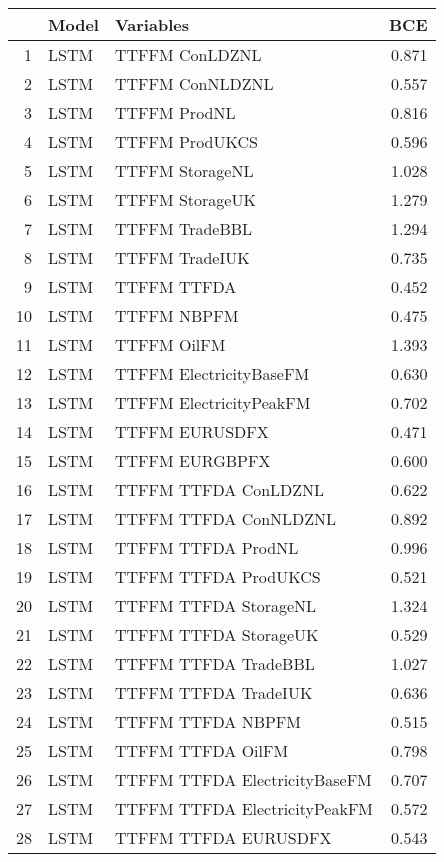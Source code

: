 \begin{table}[ht]
\centering
\begin{tabular}{rllr}
  \hline
 & Model & Variables & BCE \\ 
  \hline
1 & LSTM & TTFFM ConLDZNL & 0.871 \\ 
  2 & LSTM & TTFFM ConNLDZNL & 0.557 \\ 
  3 & LSTM & TTFFM ProdNL & 0.816 \\ 
  4 & LSTM & TTFFM ProdUKCS & 0.596 \\ 
  5 & LSTM & TTFFM StorageNL & 1.028 \\ 
  6 & LSTM & TTFFM StorageUK & 1.279 \\ 
  7 & LSTM & TTFFM TradeBBL & 1.294 \\ 
  8 & LSTM & TTFFM TradeIUK & 0.735 \\ 
  9 & LSTM & TTFFM TTFDA & 0.452 \\ 
  10 & LSTM & TTFFM NBPFM & 0.475 \\ 
  11 & LSTM & TTFFM OilFM & 1.393 \\ 
  12 & LSTM & TTFFM ElectricityBaseFM & 0.630 \\ 
  13 & LSTM & TTFFM ElectricityPeakFM & 0.702 \\ 
  14 & LSTM & TTFFM EURUSDFX & 0.471 \\ 
  15 & LSTM & TTFFM EURGBPFX & 0.600 \\ 
  16 & LSTM & TTFFM TTFDA ConLDZNL & 0.622 \\ 
  17 & LSTM & TTFFM TTFDA ConNLDZNL & 0.892 \\ 
  18 & LSTM & TTFFM TTFDA ProdNL & 0.996 \\ 
  19 & LSTM & TTFFM TTFDA ProdUKCS & 0.521 \\ 
  20 & LSTM & TTFFM TTFDA StorageNL & 1.324 \\ 
  21 & LSTM & TTFFM TTFDA StorageUK & 0.529 \\ 
  22 & LSTM & TTFFM TTFDA TradeBBL & 1.027 \\ 
  23 & LSTM & TTFFM TTFDA TradeIUK & 0.636 \\ 
  24 & LSTM & TTFFM TTFDA NBPFM & 0.515 \\ 
  25 & LSTM & TTFFM TTFDA OilFM & 0.798 \\ 
  26 & LSTM & TTFFM TTFDA ElectricityBaseFM & 0.707 \\ 
  27 & LSTM & TTFFM TTFDA ElectricityPeakFM & 0.572 \\ 
  28 & LSTM & TTFFM TTFDA EURUSDFX & 0.543 \\ 

\end{tabular}
\end{table}

